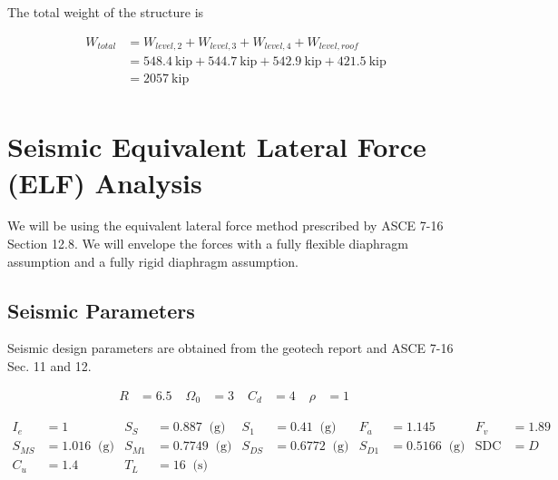 \documentclass[11pt]{article}
\begin{document}
    The total weight of the structure is

    \begin{equation*}
\begin{aligned}
W_{total} &= W_{level,2} + W_{level,3} + W_{level,4} + W_{level,roof} \\&= 548.4\ \mathrm{kip} + 544.7\ \mathrm{kip} + 542.9\ \mathrm{kip} + 421.5\ \mathrm{kip} \\&= 2057\ \mathrm{kip}  \\
\end{aligned}
\end{equation*}

    
    \section{Seismic Equivalent Lateral Force (ELF)
Analysis}\label{seismic-equivalent-lateral-force-elf-analysis}

    We will be using the equivalent lateral force method prescribed by ASCE
7-16 Section 12.8. We will envelope the forces with a fully flexible
diaphragm assumption and a fully rigid diaphragm assumption.

    \subsection{Seismic Parameters}\label{seismic-parameters}

    Seismic design parameters are obtained from the geotech report and ASCE
7-16 Sec. 11 and 12.

    \begin{equation*}
\begin{aligned}
R &= 6.5 \; 
 &\Omega_{0} &= 3 \; 
 &C_{d} &= 4 \; 
 &\rho &= 1 \;
\end{aligned}
\end{equation*}

    
    \begin{equation*}
\begin{aligned}
I_{e} &= 1 \; 
 &S_{S} &= 0.887 \; \;\textrm{(g)}
 &S_{1} &= 0.41 \; \;\textrm{(g)}
 &F_{a} &= 1.145 \; 
 &F_{v} &= 1.89 \; 
\\
 S_{MS} &= 1.016 \; \;\textrm{(g)}
 &S_{M1} &= 0.7749 \; \;\textrm{(g)}
 &S_{DS} &= 0.6772 \; \;\textrm{(g)}
 &S_{D1} &= 0.5166 \; \;\textrm{(g)}
 &\mathrm{SDC} &= D \; 
\\
 C_{u} &= 1.4 \; 
 &T_{L} &= 16 \; \;\textrm{(s)}
\end{aligned}
\end{equation*}
\end{document}
